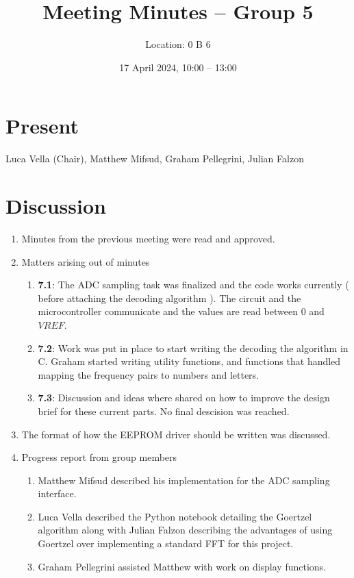 \documentclass{cce2014-meetings}
\title{Meeting Minutes -- Group 5}
\author{Location: 0 B 6}
\date{17 April 2024, 10:00 -- 13:00}
\begin{document}
\maketitle

\section*{Present}
Luca Vella (Chair),
Matthew Mifsud,
Graham Pellegrini,
Julian Falzon

\section*{Discussion}

\begin{enumerate}
   \item Minutes from the previous meeting were read and approved.

   \item Matters arising out of minutes
         \begin{enumerate}
            \item \textbf{7.1}:
                  The ADC sampling task was finalized and the code works currently ( before attaching the decoding algorithm ).
                  The circuit and the microcontroller communicate and the values are read between $0$ and $VREF$.
            \item \textbf{7.2}:
                  Work was put in place to start writing the decoding the algorithm in C.
                  Graham started writing utility functions, and functions that handled mapping the frequency pairs to numbers and letters.
            \item \textbf{7.3}:
                  Discussion and ideas where shared on how to improve the design brief for these current parts.
                  No final descision was reached.
         \end{enumerate}

      \item The format of how the EEPROM driver should be written was discussed.

      \item Progress report from group members
            \begin{enumerate}
                  \item Matthew Mifsud described his implementation for the ADC sampling interface.
                  \item Luca Vella described the Python notebook detailing the Goertzel algorithm along with Julian Falzon describing the advantages of using Goertzel over implementing a standard FFT for this project.
                  \item Graham Pellegrini assisted Matthew with work on display functions.
            \end{enumerate}


\end{enumerate}
\end{document}

